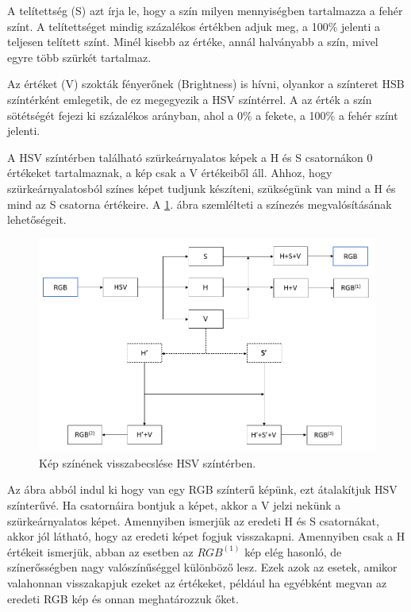 A telítettség (S) azt írja le, hogy a szín milyen mennyiségben tartalmazza a fehér színt. A telítettséget mindig százalékos értékben adjuk meg, a 100\% jelenti a teljesen telített színt. Minél kisebb az értéke, annál halványabb a szín, mivel egyre több szürkét tartalmaz.

Az értéket (V) szokták fényerőnek (Brightness) is hívni, olyankor a színteret HSB színtérként emlegetik, de ez megegyezik a HSV színtérrel. A az érték a szín sötétségét fejezi ki százalékos arányban, ahol a 0\% a fekete, a 100\% a fehér színt jelenti. \cite{colorspaces}

A HSV színtérben található szürkeárnyalatos képek a H és S csatornákon 0 értékeket tartalmaznak, a kép csak a V értékeiből áll. Ahhoz, hogy szürkeárnyalatosból színes képet tudjunk készíteni, szükségünk van mind a H és mind az S csatorna értékeire. A \ref{fig:hsv_colorization}. ábra szemlélteti a színezés megvalósításának lehetőségeit.

\begin{figure}[h]
\centering
\includegraphics[scale=0.5]{images/hsv_colorization.png}
\caption{Kép színének visszabecslése HSV színtérben.}
\label{fig:hsv_colorization}
\end{figure}

Az ábra abból indul ki hogy van egy RGB színterű képünk, ezt átalakítjuk HSV színterűvé. Ha csatornáira bontjuk a képet, akkor a V  jelzi nekünk a szürkeárnyalatos képet. Amennyiben ismerjük az eredeti H és S csatornákat, akkor jól látható, hogy az eredeti képet fogjuk visszakapni. Amennyiben csak a H értékeit ismerjük, abban az esetben az $RGB^{(1)}$ kép elég hasonló, de színerősségben nagy valószínűséggel különböző lesz. Ezek azok az esetek, amikor valahonnan visszakapjuk ezeket az értékeket, például ha egyébként megvan az eredeti RGB kép és onnan meghatározzuk őket.


